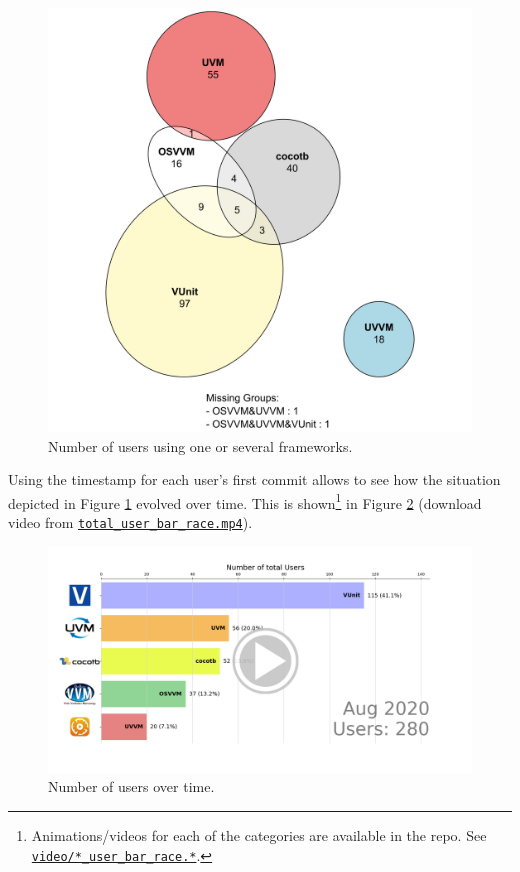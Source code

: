 \documentclass[]{article}
\begin{document}
\begin{figure}

{\centering \includegraphics[width=0.75\linewidth]{img/total_user} 

}

\caption{Number of users using one or several frameworks.}\label{fig:total-user}
\end{figure}

Using the timestamp for each user's first commit allows to see how the situation depicted in Figure \ref{fig:total-user} evolved over time. This is shown\footnote{Animations/videos for each of the categories are available in the repo. See \href{https://github.com/LarsAsplund/github-facts/tree/main/video/}{\texttt{video/*\_user\_bar\_race.*}}.} in Figure \ref{fig:total-user-bar-race} (download video from \href{https://github.com/LarsAsplund/github-facts/tree/main/video/total_user_bar_race.mp4}{\texttt{total\_user\_bar\_race.mp4}}).

\begin{figure}

{\centering \includegraphics[width=1\linewidth]{img/total_user_bar_race} 

}

\caption{Number of users over time.}\label{fig:total-user-bar-race}
\end{figure}
\end{document}
